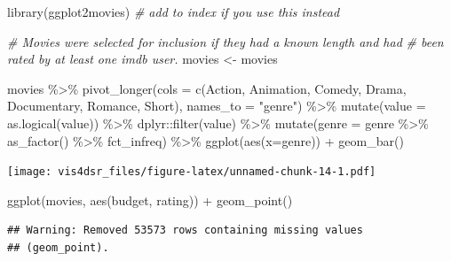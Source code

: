 \documentclass[
]{krantz}
\makeatletter
\newenvironment{Shaded}{\begin{snugshade}}{\end{snugshade}}
\newcommand{\AttributeTok}[1]{\textcolor[rgb]{0.61,0.61,0.61}{#1}}
\newcommand{\CommentTok}[1]{\textcolor[rgb]{0.37,0.37,0.37}{\textit{#1}}}
\newcommand{\FunctionTok}[1]{\textcolor[rgb]{0,0,0}{#1}}
\newcommand{\NormalTok}[1]{#1}
\newcommand{\OtherTok}[1]{\textcolor[rgb]{0.37,0.37,0.37}{#1}}
\newcommand{\SpecialCharTok}[1]{\textcolor[rgb]{0,0,0}{#1}}
\newcommand{\StringTok}[1]{\textcolor[rgb]{0.5,0.5,0.5}{#1}}
\newenvironment{kframe}{%
\medskip{}
\setlength{\fboxsep}{.8em}
 \def\at@end@of@kframe{}%
 \ifinner\ifhmode%
  \def\at@end@of@kframe{\end{minipage}}%
  \begin{minipage}{\columnwidth}%
 \fi\fi%
 \def\FrameCommand##1{\hskip\@totalleftmargin \hskip-\fboxsep
 \colorbox{shadecolor}{##1}\hskip-\fboxsep
     \hskip-\linewidth \hskip-\@totalleftmargin \hskip\columnwidth}%
 \MakeFramed {\advance\hsize-\width
   \@totalleftmargin\z@ \linewidth\hsize
   \@setminipage}}%
 {\par\unskip\endMakeFramed%
 \at@end@of@kframe}
\renewenvironment{Shaded}{\begin{kframe}}{\end{kframe}}
\makeatother
\begin{document}
\begin{Shaded}
\begin{Highlighting}[]
\FunctionTok{library}\NormalTok{(ggplot2movies) }\CommentTok{\# add to index if you use this instead}

\CommentTok{\# Movies were selected for inclusion if they had a known length and had }
\CommentTok{\# been rated by at least one imdb user.}
\NormalTok{movies }\OtherTok{\textless{}{-}}\NormalTok{ movies}
\end{Highlighting}
\end{Shaded}

\begin{Shaded}
\begin{Highlighting}[]
\NormalTok{movies }\SpecialCharTok{\%\textgreater{}\%} 
  \FunctionTok{pivot\_longer}\NormalTok{(}\AttributeTok{cols =} \FunctionTok{c}\NormalTok{(Action, Animation, Comedy, Drama, Documentary, Romance, Short), }\AttributeTok{names\_to =} \StringTok{"genre"}\NormalTok{) }\SpecialCharTok{\%\textgreater{}\%}
  \FunctionTok{mutate}\NormalTok{(}\AttributeTok{value =} \FunctionTok{as.logical}\NormalTok{(value)) }\SpecialCharTok{\%\textgreater{}\%}
\NormalTok{  dplyr}\SpecialCharTok{::}\FunctionTok{filter}\NormalTok{(value) }\SpecialCharTok{\%\textgreater{}\%}
  \FunctionTok{mutate}\NormalTok{(}\AttributeTok{genre =}\NormalTok{ genre }\SpecialCharTok{\%\textgreater{}\%}
           \FunctionTok{as\_factor}\NormalTok{() }\SpecialCharTok{\%\textgreater{}\%}
\NormalTok{           fct\_infreq) }\SpecialCharTok{\%\textgreater{}\%}
  \FunctionTok{ggplot}\NormalTok{(}\FunctionTok{aes}\NormalTok{(}\AttributeTok{x=}\NormalTok{genre)) }\SpecialCharTok{+}
    \FunctionTok{geom\_bar}\NormalTok{()}
\end{Highlighting}
\end{Shaded}

\texttt{[image: vis4dsr\_files/figure-latex/unnamed-chunk-14-1.pdf]}

\begin{Shaded}
\begin{Highlighting}[]
\FunctionTok{ggplot}\NormalTok{(movies, }\FunctionTok{aes}\NormalTok{(budget, rating)) }\SpecialCharTok{+}
  \FunctionTok{geom\_point}\NormalTok{()}
\end{Highlighting}
\end{Shaded}

\begin{verbatim}
## Warning: Removed 53573 rows containing missing values
## (geom_point).
\end{verbatim}
\end{document}
